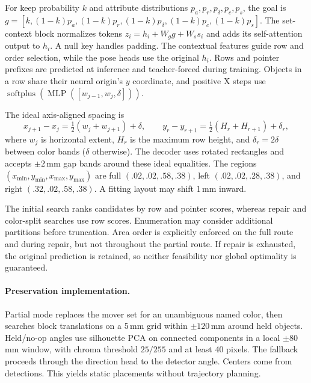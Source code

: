 For keep probability $k$ and attribute distributions $p_a,p_r,p_\delta,p_c,p_s$, the goal is $g=[k,(1-k)p_a,(1-k)p_r,(1-k)p_\delta,(1-k)p_c,(1-k)p_s]$. The set-context block normalizes tokens $z_i=h_i+W_g g+W_s s_i$ and adds its self-attention output to $h_i$. A null key handles padding. The contextual features guide row and order selection, while the pose heads use the original $h_i$. Rows and pointer prefixes are predicted at inference and teacher-forced during training. Objects in a row share their neural origin's $y$ coordinate, and positive X steps use $\operatorname{softplus}(\operatorname{MLP}([w_{j-1},w_j,\delta]))$.

The ideal axis-aligned spacing is
\begin{equation}
 x_{j+1}-x_j=\tfrac12(w_j+w_{j+1})+\delta,\qquad
 y_r-y_{r+1}=\tfrac12(H_r+H_{r+1})+\delta_r,
\label{eq:spacing}
\end{equation}
where $w_j$ is horizontal extent, $H_r$ is the maximum row height, and $\delta_r=2\delta$ between color bands ($\delta$ otherwise). The decoder uses rotated rectangles and accepts $\pm2$\,mm gap bands around these ideal equalities. The regions $(x_{\min},y_{\min},x_{\max},y_{\max})$ are full $(.02,.02,.58,.38)$, left $(.02,.02,.28,.38)$, and right $(.32,.02,.58,.38)$. A fitting layout may shift 1\,mm inward.

The initial search ranks candidates by row and pointer scores, whereas repair and color-split searches use row scores. Enumeration may consider additional partitions before truncation. Area order is explicitly enforced on the full route and during repair, but not throughout the partial route. If repair is exhausted, the original prediction is retained, so neither feasibility nor global optimality is guaranteed.

\paragraph{Preservation implementation.}
Partial mode replaces the mover set for an unambiguous named color, then searches block translations on a 5\,mm grid within $\pm120$\,mm around held objects. Held/no-op angles use silhouette PCA on connected components in a local $\pm80$\,mm window, with chroma threshold $25/255$ and at least 40 pixels. The fallback proceeds through the direction head to the detector angle. Centers come from detections. This yields static placements without trajectory planning.

